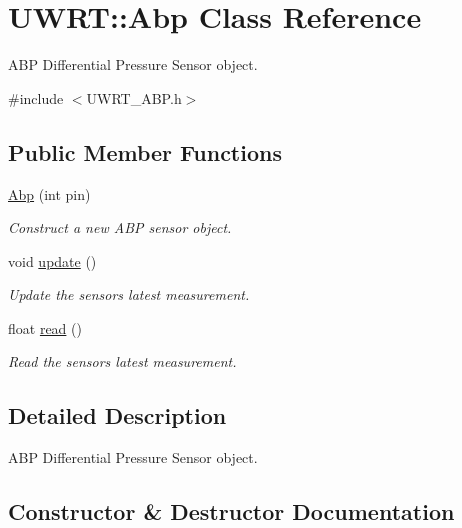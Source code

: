 \hypertarget{classUWRT_1_1Abp}{}\section{U\+W\+RT\+:\+:Abp Class Reference}
\label{classUWRT_1_1Abp}


A\+BP Differential Pressure Sensor object.  




{\ttfamily \#include $<$U\+W\+R\+T\+\_\+\+A\+B\+P.\+h$>$}

\subsection*{Public Member Functions}
\begin{DoxyCompactItemize}
\item 
\hyperlink{classUWRT_1_1Abp_aa02aadb085c304dd40dd718d84c6fbc7}{Abp} (int pin)
\begin{DoxyCompactList}\small\item\em Construct a new A\+BP sensor object. \end{DoxyCompactList}\item 
void \hyperlink{classUWRT_1_1Abp_a00ab966975968f335412a890322f84b1}{update} ()\hypertarget{classUWRT_1_1Abp_a00ab966975968f335412a890322f84b1}{}\label{classUWRT_1_1Abp_a00ab966975968f335412a890322f84b1}

\begin{DoxyCompactList}\small\item\em Update the sensor\textquotesingle{}s latest measurement. \end{DoxyCompactList}\item 
float \hyperlink{classUWRT_1_1Abp_a4911fac0ebe9c9f618020bde4474d7c8}{read} ()
\begin{DoxyCompactList}\small\item\em Read the sensor\textquotesingle{}s latest measurement. \end{DoxyCompactList}\end{DoxyCompactItemize}


\subsection{Detailed Description}
A\+BP Differential Pressure Sensor object. 

\subsection{Constructor \& Destructor Documentation}
